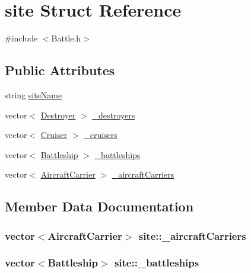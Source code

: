 \hypertarget{structsite}{}\section{site Struct Reference}
\label{structsite}


{\ttfamily \#include $<$Battle.\+h$>$}

\subsection*{Public Attributes}
\begin{DoxyCompactItemize}
\item 
string \hyperlink{structsite_ae4192402457d29b056ec34ebc57b535e}{site\+Name}
\item 
vector$<$ \hyperlink{class_destroyer}{Destroyer} $>$ \hyperlink{structsite_af920c7e8cfc6306cde0d45b9850af20e}{\+\_\+destroyers}
\item 
vector$<$ \hyperlink{class_cruiser}{Cruiser} $>$ \hyperlink{structsite_ae2ae4dc2c4f396ead27233eb03e7756f}{\+\_\+cruisers}
\item 
vector$<$ \hyperlink{class_battleship}{Battleship} $>$ \hyperlink{structsite_ad15b3351029ffbb3ea21c75e05f6a1b3}{\+\_\+battleships}
\item 
vector$<$ \hyperlink{class_aircraft_carrier}{Aircraft\+Carrier} $>$ \hyperlink{structsite_a19551d075f273b4c5546f704f01ad471}{\+\_\+aircraft\+Carriers}
\end{DoxyCompactItemize}


\subsection{Member Data Documentation}
\subsubsection[{\texorpdfstring{\+\_\+aircraft\+Carriers}{_aircraftCarriers}}]{\setlength{\rightskip}{0pt plus 5cm}vector$<${\bf Aircraft\+Carrier}$>$ site\+::\+\_\+aircraft\+Carriers}\hypertarget{structsite_a19551d075f273b4c5546f704f01ad471}{}\label{structsite_a19551d075f273b4c5546f704f01ad471}
\subsubsection[{\texorpdfstring{\+\_\+battleships}{_battleships}}]{\setlength{\rightskip}{0pt plus 5cm}vector$<${\bf Battleship}$>$ site\+::\+\_\+battleships}\hypertarget{structsite_ad15b3351029ffbb3ea21c75e05f6a1b3}{}\label{structsite_ad15b3351029ffbb3ea21c75e05f6a1b3}
